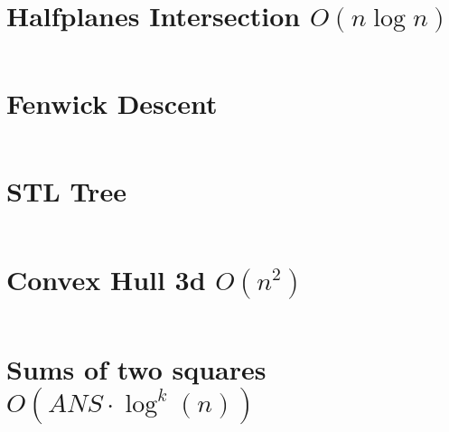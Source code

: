 \documentclass{article}
\begin{document}
\begin{multicols}{2}
\section*{Halfplanes Intersection $O(n \log n)$}
\inputminted[frame=single,breaklines]{cpp}{../halfplanes_intersection_nlog_short.cpp}

\section*{Fenwick Descent}
\inputminted[frame=single,breaklines]{cpp}{../fenwick_descent.cpp}

\section*{STL Tree}
\inputminted[frame=single,breaklines]{cpp}{../stl_tree_import.cpp}

\section*{Convex Hull 3d $O(n^2)$}
\inputminted[frame=single,breaklines]{cpp}{../convex-hull-3d-crop.cpp}

\section*{Sums of two squares $O(ANS\cdot\log^k(n))$}
\inputminted[frame=single,breaklines]{cpp}{../sums_of_two_squares.cpp}

\end{multicols}
\end{document}
